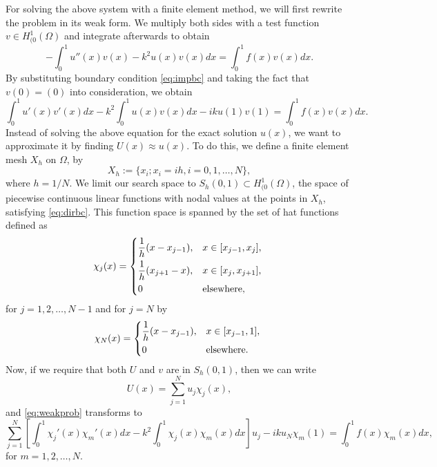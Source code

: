 \documentclass[a4paper]{article}
\newcommand{\HOzero}{\ensuremath{H^1_{(0}(\Omega)}}
\begin{document}
For solving the above system with a finite element method, we will
first rewrite the problem in its weak form.  We multiply both sides
with a test function $v \in \HOzero$ and integrate afterwards to
obtain
\begin{equation}
  - \int^1_0 u''(x)v(x) - k^2u(x)v(x) dx = \int^1_0 f(x)v(x) dx.
\end{equation}
By substituting boundary condition \eqref{eq:impbc} and taking the fact
that $v(0) = (0)$ into consideration, we obtain
\begin{equation} \label{eq:weakprob}
  \int^1_0 u'(x)v'(x)dx - k^2 \int^1_0 u(x)v(x) dx - iku(1)v(1) = \int^1_0 f(x)v(x) dx.
\end{equation}
Instead of solving the above equation for the exact solution $u(x)$,
we want to approximate it by finding $U(x) \approx u(x)$. To do this,
we define a finite element mesh $X_h$ on $\Omega$, by
\begin{equation}
  X_h := \{ x_i ; x_i = ih, i = 0, 1, \ldots, N \},
\end{equation}
where $h = 1/N$.
We limit our search space to $S_h(0,1) \subset \HOzero$, the space of
piecewise continuous linear functions with nodal values at the points
in $X_h$, satisfying \eqref{eq:dirbc}. This function space is spanned
by the set of hat functions defined as
\begin{equation}
  \chi_j(x) = \begin{dcases*}
    \frac{1}{h} (x - x_{j - 1}), & $x \in [x_{j - 1}, x_j],$ \\
    \frac{1}{h} (x_{j + 1} - x), & $x \in [x_{j}, x_{j + 1}],$ \\
    0 & elsewhere,
  \end{dcases*}
\end{equation}
for $j = 1, 2, \ldots, N - 1$ and for $j = N$ by
\begin{equation}
  \chi_N(x) = \begin{dcases*}
    \frac{1}{h} (x - x_{j - 1}), & $x \in [x_{j - 1}, 1],$ \\
    0 & elsewhere.
  \end{dcases*}
\end{equation}
Now, if we require that both $U$ and $v$ are in  $S_h(0,1)$, then we
can write
\begin{equation} \label{eq:Usum}
  U(x) = \sum^N_{j = 1} u_j \chi_j(x),
\end{equation}
and \eqref{eq:weakprob} transforms to
\begin{equation} \label{eq:linsys}
  \sum^N_{j = 1} \left[ \int^1_0 \chi_j'(x) \chi_m'(x) dx
    - k^2 \int^1_0 \chi_j(x) \chi_m(x) dx \right] u_j
    - i k u_N \chi_m(1)
  =
    \int^1_0 f(x) \chi_m(x) dx,
\end{equation}
for $m = 1, 2, \ldots, N$.
\end{document}
